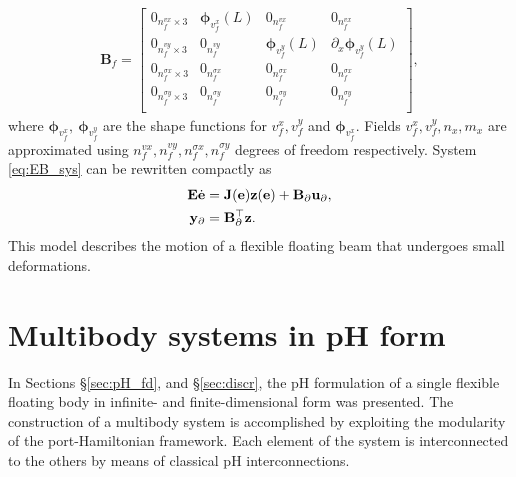 \documentclass{svjour3}                     %
\newcommand{\secref}[1]{\S\ref{#1}}
\begin{document}
\begin{align*}
\mathbf{B}_{f} = \begin{bmatrix}
0_{n_f^{vx} \times 3} & \bm{\phi}_{v_f^x}(L) & 0_{n_f^{vx}} & 0_{n_f^{vx}} \\
0_{n_f^{vy} \times 3} & 0_{n_f^{vy}} & \bm{\phi}_{v_f^y}(L) & \partial_x \bm{\phi}_{v_f^y}(L) \\
0_{n_f^{\sigma x} \times 3} & 0_{n_f^{\sigma x}} & 0_{n_f^{\sigma x}} & 0_{n_f^{\sigma x}} \\
0_{n_f^{\sigma y} \times 3} & 0_{n_f^{\sigma y}} & 0_{n_f^{\sigma y}} & 0_{n_f^{\sigma y}} \\
\end{bmatrix},
\end{align*}
where $\bm{\phi}_{v_f^x}, \ \bm{\phi}_{v_f^y}$ are the shape functions for ${v}_f^x, {v}_f^y$ and $\bm{\phi}_{v_f^x}$. Fields ${v}_f^x, {v}_f^y, n_x, m_x$ are approximated using $n_f^{vx}, n_f^{vy}, n_f^{\sigma x}, n_f^{\sigma y}$ degrees of freedom respectively. System \eqref{eq:EB_sys} can be rewritten compactly as
\begin{equation}
\label{eq:beam_discr}
\begin{aligned}
\mathbf{E} \dot{\mathbf{e}} &= \mathbf{J}(\mathbf{e}) \mathbf{z}(\mathbf{e}) + \mathbf{B}_\partial \mathbf{u}_\partial, \vspace{2mm} \\
\mathbf{y}_\partial &= \mathbf{B}_\partial^{\top}  \mathbf{z}. \\
\end{aligned}
\end{equation}
This model describes the motion of a flexible floating beam that undergoes small deformations. 

\section{Multibody systems in pH form}
\label{sec:MB_pH}
In Sections \secref{sec:pH_fd}, and \secref{sec:discr}, the pH formulation of a single flexible floating body in infinite- and finite-dimensional form was presented. The construction of a multibody system is accomplished by exploiting the modularity of the port-Hamiltonian framework. Each element of the system is interconnected to the others by means of classical pH interconnections.
\end{document}
